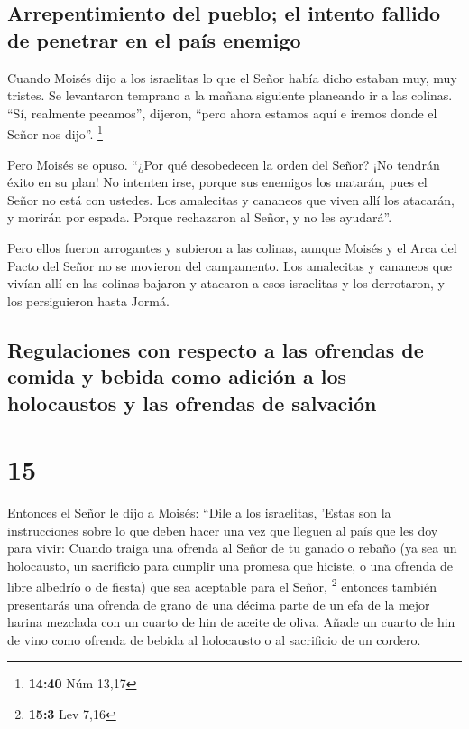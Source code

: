 \hypertarget{arrepentimiento-del-pueblo-el-intento-fallido-de-penetrar-en-el-pauxeds-enemigo}{%
\subsection{Arrepentimiento del pueblo; el intento fallido de penetrar
en el país
enemigo}\label{arrepentimiento-del-pueblo-el-intento-fallido-de-penetrar-en-el-pauxeds-enemigo}}

 Cuando Moisés dijo a los israelitas lo que el Señor
había dicho estaban muy, muy tristes.  Se levantaron
temprano a la mañana siguiente planeando ir a las colinas. ``Sí,
realmente pecamos'', dijeron, ``pero ahora estamos aquí e iremos donde
el Señor nos dijo''. \footnote{\textbf{14:40} Núm 13,17}

 Pero Moisés se opuso. ``¿Por qué desobedecen la orden
del Señor? ¡No tendrán éxito en su plan!  No intenten
irse, porque sus enemigos los matarán, pues el Señor no está con
ustedes.  Los amalecitas y cananeos que viven allí los
atacarán, y morirán por espada. Porque rechazaron al Señor, y no les
ayudará''.

 Pero ellos fueron arrogantes y subieron a las colinas,
aunque Moisés y el Arca del Pacto del Señor no se movieron del
campamento.  Los amalecitas y cananeos que vivían allí en
las colinas bajaron y atacaron a esos israelitas y los derrotaron, y los
persiguieron hasta Jormá.

\hypertarget{regulaciones-con-respecto-a-las-ofrendas-de-comida-y-bebida-como-adiciuxf3n-a-los-holocaustos-y-las-ofrendas-de-salvaciuxf3n}{%
\subsection{Regulaciones con respecto a las ofrendas de comida y bebida
como adición a los holocaustos y las ofrendas de
salvación}\label{regulaciones-con-respecto-a-las-ofrendas-de-comida-y-bebida-como-adiciuxf3n-a-los-holocaustos-y-las-ofrendas-de-salvaciuxf3n}}

\hypertarget{section-14}{%
\section{15}\label{section-14}}

 Entonces el Señor le dijo a Moisés:  ``Dile
a los israelitas, 'Estas son la instrucciones sobre lo que deben hacer
una vez que lleguen al país que les doy para vivir: 
Cuando traiga una ofrenda al Señor de tu ganado o rebaño (ya sea un
holocausto, un sacrificio para cumplir una promesa que hiciste, o una
ofrenda de libre albedrío o de fiesta) que sea aceptable para el Señor,
\footnote{\textbf{15:3} Lev 7,16}  entonces también
presentarás una ofrenda de grano de una décima parte de un efa de la
mejor harina mezclada con un cuarto de hin de aceite de oliva.
 Añade un cuarto de hin de vino como ofrenda de bebida al
holocausto o al sacrificio de un cordero.

